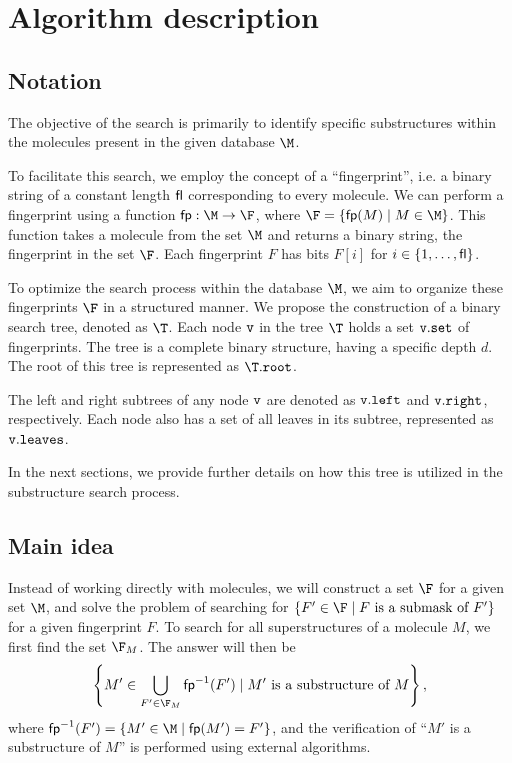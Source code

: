 \section{Algorithm description}

\subsection{Notation}

The objective of the search is primarily to identify specific substructures within the molecules present in the 
given database $\M$.

To facilitate this search, we employ the concept of a ``fingerprint'', i.e. a binary string of a constant length 
${\sf fl}$ corresponding to every molecule. We can perform a fingerprint using a function ${\sf fp}: \M \to \F$, 
where $\F = \{{\sf fp}(M) \mid M \in \M\}$. This function takes a molecule from the set $\M$ and returns a binary 
string, the fingerprint in the set $\F$. Each fingerprint $F$ has bits  $F[i]$ for $i\in\{ 1,\ldots, {\sf fl}\}$.

To optimize the search process within the database $\M$, we aim to organize these fingerprints $\F$ in a 
structured manner. We propose the construction of a binary search tree, denoted as $\T$. Each node $\tt{v}$ 
in the tree $\T$ holds a set $\tt{v.set}$ of fingerprints. The tree is a complete binary structure, having a 
specific depth $d$. The root of this tree is represented as $\T.\tt{root}$.

The left and right subtrees of any node $\tt{v}$ are denoted as $\tt{v.left}$ and $\tt{v.right}$, respectively. 
Each node also has a set of all leaves in its subtree, represented as $\tt{v.leaves}$. 

In the next sections, we provide further details on how this tree is utilized in the substructure search process.






\subsection{Main idea}
Instead of working directly with molecules, we will construct a set $\F$ for a given set $\M$, and solve the problem 
of searching for $\{F' \in \F \mid F \text{ is a submask of } F'\}$ for a given fingerprint $F$. To search for all 
superstructures of a molecule $M$, we first find the set $\F_M$. The answer will then be 
$$\left\{ M' \in \bigcup\limits_{F' \in \F_M} {\sf fp}^{-1}(F') \mid M' \text{ is a substructure of } M \right\},$$ 
where ${\sf fp}^{-1}(F') = \left\{M' \in \M \mid {\sf fp}(M') = F'\right\}$, and the verification of ``$M'$ is a 
substructure of $M$'' is performed using external algorithms.

